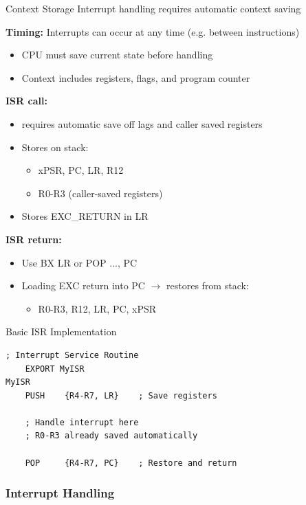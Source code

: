 \begin{definition}{Context Storage}
Interrupt handling requires automatic context saving

\textbf{Timing:} Interrupts can occur at any time (e.g. between instructions)
\begin{itemize}
  \item CPU must save current state before handling
  \item Context includes registers, flags, and program counter
\end{itemize}

\textbf{ISR call:}
\begin{itemize}
  \item requires automatic save off lags and caller saved registers
  \item Stores on stack:
    \begin{itemize}
      \item xPSR, PC, LR, R12
      \item R0-R3 (caller-saved registers)
    \end{itemize}
  \item Stores EXC\_RETURN in LR
\end{itemize}

\textbf{ISR return:}
\begin{itemize}
  \item Use BX LR or POP {..., PC}
  \item Loading EXC return into PC $\rightarrow$ restores from stack:
    \begin{itemize}
      \item R0-R3, R12, LR, PC, xPSR
    \end{itemize}
\end{itemize}
\end{definition}

\begin{example2}{Basic ISR Implementation}
\begin{lstlisting}[language=armasm, style=basesmol]
    ; Interrupt Service Routine
    EXPORT MyISR
MyISR
    PUSH    {R4-R7, LR}    ; Save registers
    
    ; Handle interrupt here
    ; R0-R3 already saved automatically
    
    POP     {R4-R7, PC}    ; Restore and return
\end{lstlisting}
\end{example2}

\subsubsection{Interrupt Handling}



